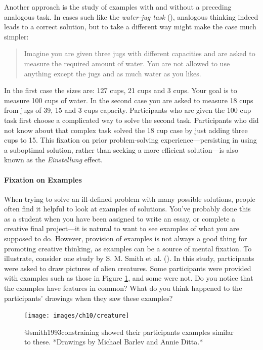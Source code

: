 \documentclass[
]{krantz}
\begin{document}
Another approach is the study of examples with and without a preceding analogous task. In cases such like the \emph{water-jug task} (), analogous thinking indeed leads to a correct solution, but to take a different way might make the case much simpler:

\begin{quote}
Imagine you are given three jugs with different capacities and are asked to measure the required amount of water. You are not allowed to use anything except the jugs and as much water as you likes.
\end{quote}

In the first case the sizes are: 127 cups, 21 cups and 3 cups. Your goal is to measure 100 cups of water. In the second case you are asked to measure 18 cups from jugs of 39, 15 and 3 cups capacity. Participants who are given the 100 cup task first choose a complicated way to solve the second task. Participants who did not know about that complex task solved the 18 cup case by just adding three cups to 15. This fixation on prior problem-solving experience---persisting in using a suboptimal solution, rather than seeking a more efficient solution---is also known as the \emph{Einstellung} effect.

\paragraph*{Fixation on Examples}\label{fixation-on-examples}

When trying to solve an ill-defined problem with many possible solutions, people often find it helpful to look at examples of solutions. You've probably done this as a student when you have been assigned to write an essay, or complete a creative final project---it is natural to want to see examples of what you are supposed to do. However, provision of examples is not always a good thing for promoting creative thinking, as examples can be a source of mental fixation. To illustrate, consider one study by S. M. Smith et al. (). In this study, participants were asked to draw pictures of alien creatures. Some participants were provided with examples such as those in Figure \ref{fig:creature}, and some were not. Do you notice that the examples have features in common? What do you think happened to the participants' drawings when they saw these examples?

\begin{figure}

{\centering \texttt{[image: images/ch10/creature]} 

}

\caption{@smith1993constraining showed their participants examples similar to these. *Drawings by Michael Barlev and Annie Ditta.*}\label{fig:creature}
\end{figure}
\end{document}
